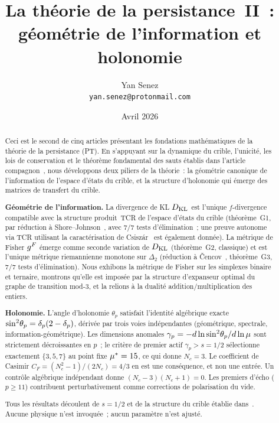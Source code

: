 \documentclass[12pt,a4paper]{article}
\title{\textbf{La théorie de la persistance~II~:\\
géométrie de l'information et holonomie}}
\author{Yan Senez\\\texttt{yan.senez@protonmail.com}}
\date{Avril 2026}
\begin{document}
\maketitle

\begin{abstract}
Ceci est le second de cinq articles présentant les fondations
mathématiques de la théorie de la persistance (PT). En s'appuyant sur la
dynamique du crible, l'unicité, les lois de conservation et le théorème
fondamental des sauts établis dans l'article
compagnon~\cite{companion_M1}, nous développons deux piliers de la
théorie~: la géométrie canonique de l'information de l'espace d'états du
crible, et la structure d'holonomie qui émerge des matrices de transfert
du crible.

\textbf{Géométrie de l'information.}
La divergence de KL $D_{\mathrm{KL}}$ est l'unique $f$-divergence compatible avec
la structure produit~TCR de l'espace d'états du crible
(théorème~G1, par réduction à Shore--Johnson~\cite{ShoreJohnson1980},
avec 7/7 tests d'élimination~; une preuve autonome via TCR utilisant la
caractérisation de Csisz\'ar~\cite{Csiszar1967} est également donnée).
La métrique de Fisher $g^F$ émerge comme seconde variation de
$D_{\mathrm{KL}}$ (théorème~G2, classique) et est l'unique métrique riemannienne
monotone sur $\Delta_2$ (réduction à \v{C}encov~\cite{Cencov1982},
théorème~G3, 7/7 tests d'élimination). Nous exhibons la métrique de
Fisher sur les simplexes binaire et ternaire, montrons qu'elle est
imposée par la structure d'expanseur optimal du graphe de transition
mod-3, et la relions à la dualité addition/multiplication des entiers.

\textbf{Holonomie.}
L'angle d'holonomie $\theta_p$ satisfait l'identité algébrique exacte
$\sin^2\!\theta_{p} = \delta_p(2 - \delta_p)$, dérivée par trois voies
indépendantes (géométrique, spectrale, information-géométrique). Les
dimensions anomales $\gamma_p = -d\ln\sin^2\!\theta_{p}/d\ln\mu$ sont strictement
décroissantes en $p$~; le critère de premier actif $\gamma_p > s = 1/2$
sélectionne exactement $\{3, 5, 7\}$ au point fixe ${\mu^{*}} = 15$, ce
qui donne $N_c = 3$. Le coefficient de Casimir
$C_F = (N_c^2 - 1)/(2N_c) = 4/3$ en est une conséquence, et non une
entrée. Un contrôle algébrique indépendant donne
$(N_c - 3)(N_c + 1) = 0$. Les premiers d'écho ($p \geq 11$) contribuent
perturbativement comme corrections de polarisation du vide.

Tous les résultats découlent de $s = 1/2$ et de la structure du crible
établie dans~\cite{companion_M1}. Aucune physique n'est invoquée~;
aucun paramètre n'est ajusté.
\end{abstract}
\end{document}
